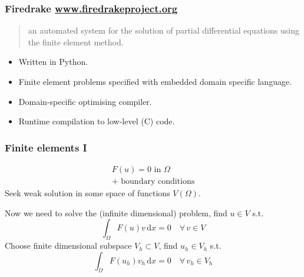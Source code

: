 \documentclass[presentation,aspectratio=43,10pt]{beamer}
\begin{document}
\begin{frame}
  \frametitle{Firedrake \url{www.firedrakeproject.org}}
  \begin{quote}
    {\normalfont [\ldots]} an automated system for the solution of
    partial differential equations using the finite element method.
  \end{quote}
  \begin{itemize}
  \item Written in Python.
  \item Finite element problems specified with embedded domain
    specific language.
  \item Domain-specific optimising compiler.
  \item Runtime compilation to low-level (C) code.
  \end{itemize}
\end{frame}
\begin{frame}
  \frametitle{Finite elements I}
  \begin{align*}
    F(u) = 0 \text{ in $\Omega$}\\
    \text{+ boundary conditions}
  \end{align*}
  Seek weak solution in some space of functions $V(\Omega)$.

  Now we need to solve the (infinite dimensional) problem, find $u\in V$ s.t.
  \begin{equation*}
    \int_\Omega \!F(u) v\, \text{d}x = 0 \quad \forall\, v \in V
  \end{equation*}
  Choose finite dimensional subspace $V_h \subset V$, find $u_h \in V_h$ s.t.
  \begin{equation*}
    \int_\Omega \!F(u_h) v_h\, \text{d}x = 0 \quad \forall\, v_h \in V_h
  \end{equation*}
\end{frame}
\end{document}
